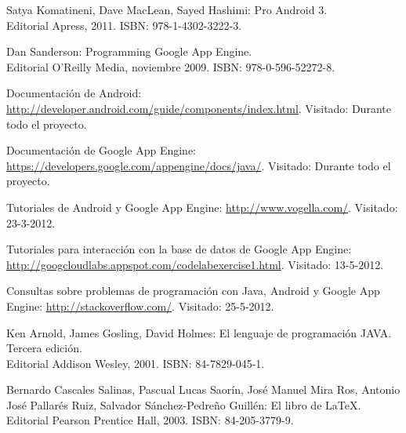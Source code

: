 \begin{thebibliography}{99}

 Satya Komatineni, Dave MacLean, Sayed Hashimi: Pro Android 3.
\\Editorial Apress, 2011. ISBN: 978-1-4302-3222-3.

 Dan Sanderson: Programming Google App Engine.
\\Editorial O'Reilly Media, noviembre 2009. ISBN: 978-0-596-52272-8.

 Documentación de Android: 
\url{http://developer.android.com/guide/components/index.html}. Visitado: Durante todo el proyecto.

 Documentación de Google App Engine: \url{https://developers.google.com/appengine/docs/java/}. Visitado: Durante todo el proyecto.

 Tutoriales de Android y Google App Engine: \url{http://www.vogella.com/}. Visitado: 23-3-2012.

 Tutoriales para interacción con la base de datos de Google App Engine: \url{http://googcloudlabs.appspot.com/codelabexercise1.html}. Visitado: 13-5-2012.

 Consultas sobre problemas de programación con Java, Android y Google App Engine: \url{http://stackoverflow.com/}. Visitado: 25-5-2012.

 Ken Arnold, James Gosling, David Holmes: El lenguaje de programación JAVA\texttrademark. Tercera edición.
\\Editorial Addison Wesley, 2001. ISBN: 84-7829-045-1.

 Bernardo Cascales Salinas, Pascual Lucas Saorín, José Manuel Mira Ros, Antonio José Pallarés Ruiz, Salvador Sánchez-Pedreño Guillén: El libro de \LaTeX{}.
\\Editorial Pearson Prentice Hall, 2003. ISBN: 84-205-3779-9.

\end{thebibliography}
